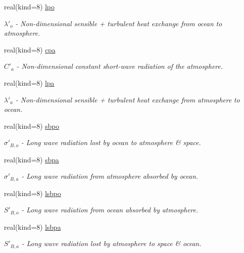 \begin{DoxyCompactItemize}
real(kind=8) \hyperlink{classparams_aa668795ed0785dc42a43980c82ba058e}{lpo}
\begin{DoxyCompactList}\small\item\em $\lambda'_o$ -\/ Non-\/dimensional sensible + turbulent heat exchange from ocean to atmosphere. \end{DoxyCompactList}\item 
real(kind=8) \hyperlink{classparams_a5194d820b8962ee2b99a455a2892a2e2}{cpa}
\begin{DoxyCompactList}\small\item\em $C'_a$ -\/ Non-\/dimensional constant short-\/wave radiation of the atmosphere. \end{DoxyCompactList}\item 
real(kind=8) \hyperlink{classparams_abc64b12ee840e1d848729ea868221117}{lpa}
\begin{DoxyCompactList}\small\item\em $\lambda'_a$ -\/ Non-\/dimensional sensible + turbulent heat exchange from atmosphere to ocean. \end{DoxyCompactList}\item 
real(kind=8) \hyperlink{classparams_a630ac570afd5c9c7030ca416f3a860a4}{sbpo}
\begin{DoxyCompactList}\small\item\em $\sigma'_{B,o}$ -\/ Long wave radiation lost by ocean to atmosphere \& space. \end{DoxyCompactList}\item 
real(kind=8) \hyperlink{classparams_abf0cb93f1f5b90e3cfd2c70d88c92d38}{sbpa}
\begin{DoxyCompactList}\small\item\em $\sigma'_{B,a}$ -\/ Long wave radiation from atmosphere absorbed by ocean. \end{DoxyCompactList}\item 
real(kind=8) \hyperlink{classparams_ae29ef1b81e159c7bff47aa8303710583}{lsbpo}
\begin{DoxyCompactList}\small\item\em $S'_{B,o}$ -\/ Long wave radiation from ocean absorbed by atmosphere. \end{DoxyCompactList}\item 
real(kind=8) \hyperlink{classparams_a2422205ab99f9886746672ee91b775a8}{lsbpa}
\begin{DoxyCompactList}\small\item\em $S'_{B,a}$ -\/ Long wave radiation lost by atmosphere to space \& ocean. \end{DoxyCompactList}\item 

\end{DoxyCompactItemize}

